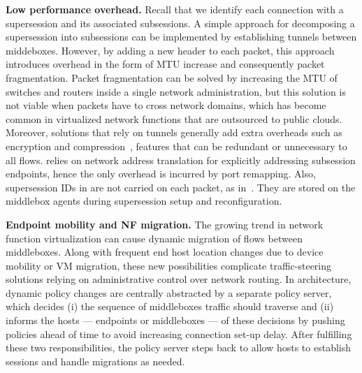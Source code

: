 {\bf   Low  performance overhead.}   Recall    that we  identify  each
connection  with a   supersession and  its   associated subsessions. A
simple approach for decomposing a supersession into subsessions can be
implemented by establishing  tunnels between middeboxes.   However, by
adding a  new  header  to   each  packet,  this  approach   introduces  overhead   in the form of MTU  increase    and consequently  packet
fragmentation. Packet fragmentation  can  be solved by  increasing the
MTU of switches  and routers inside  a single  network administration,
but this  solution is not  viable when packets  have  to cross network
domains,  which   has become   common   in virtualized  network
functions that are outsourced to  public clouds.  Moreover,  solutions
that rely on tunnels generally add extra  overheads such as encryption
and compression~\cite{Aplomb}, features  that  can be   redundant or
unnecessary  to   all   flows.  \system   relies   on network  address
translation for explicitly  addressing subsession endpoints, hence the
only overhead is incurred by  port remapping.  Also, supersession  IDs
in \system are not carried on each  packet, as in~\cite{DOA}. They are
stored   on the   middlebox   agents  during  supersession   setup  and reconfiguration.

{\bf  Endpoint  mobility and  NF   migration.}  
The growing trend in network function virtualization can cause dynamic
migration of flows between  middleboxes. Along with frequent  end host
location changes  due to device mobility  or  VM migration,  these new
possibilities  complicate     traffic-steering  solutions  relying  on
administrative control over network routing.  In \system architecture, dynamic policy changes are centrally abstracted by
a  separate policy  server, which decides  (i)   the sequence of  middleboxes
traffic should traverse and  (ii) informs the hosts --- endpoints
or  middleboxes --- of these decisions by pushing  policies ahead of time
to avoid increasing connection set-up  delay.  After fulfilling these two responsibilities, the policy server steps back  to allow  hosts to establish sessions and handle
migrations as needed.


